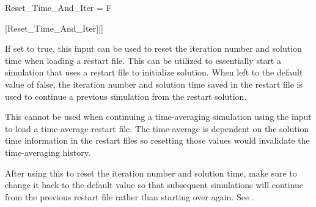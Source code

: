 %
%
%


\begin{nmldescitem}
Reset_Time_And_Iter = F
\end{nmldescitem}
[Reset\_Time\_And\_Iter][]

\begin{nmldescbody}
If set to true, this input can be used to reset the iteration number and
solution time when loading a restart file.
%
This can be utilized to essentially start a  simulation that uses a
restart file to initialize solution.
%
When left to the default value of false, the iteration number and solution time
saved in the restart file is used to continue a previous simulation from the
restart solution.
 
\NOTE
This cannot be used when continuing a time-averaging simulation using the input
 to load a time-average restart
file.
%
The time-average is dependent on the solution time information in the restart
files so resetting those values would invalidate the time-averaging history.

\NOTE
After using this to reset the iteration number and solution time, make sure to
change it back to the default value
so that subsequent simulations will continue from the previous restart file
rather than starting over again.
See \pref{\pageref{key:InitializationSequence}}.

\end{nmldescbody}

